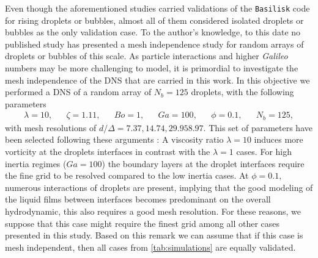 Even though the aforementioned studies carried validations of the \texttt{Basilisk} code for rising droplets or bubbles, almost all of them considered isolated droplets or bubbles as the only validation case. 
To the author's knowledge, to this date no published study has presented a mesh independence study for random arrays of droplets or bubbles of this scale. 
As particle interactions and higher \textit{Galileo} numbers may be more challenging to model, it is primordial to investigate the mesh independence of the DNS that are carried in this work. 
In this objective we performed a DNS of a random array of $N_b=125$ droplets, with the following parameters
\begin{align*}
    \lambda = 10,
    && \zeta = 1.11,
    && Bo = 1,
    && Ga = 100,
    && \phi = 0.1,
    && N_b =125,
\end{align*}
with mesh resolutions of $d/\Delta = 7.37, 14.74, 29.9 58.97$. 
This set of parameters have been selected following these arguments :
A viscosity ratio $\lambda = 10$ induces more vorticity at the droplets interfaces in contrast with the $\lambda = 1$ cases. 
For high inertia regimes ($Ga = 100$) the boundary layers at the droplet interfaces require the fine grid to be resolved compared to the low inertia cases. 
At $\phi = 0.1$, numerous interactions of droplets are present, implying that the good modeling of the liquid films between interfaces becomes predominant on the overall hydrodynamic, this also requires a good mesh resolution. 
For these reasons, we suppose that this case might require the finest grid among all other cases presented in this study. 
Based on this remark we can assume that if this case is mesh independent, then all cases from \ref{tab:simulations} are equally validated. 

